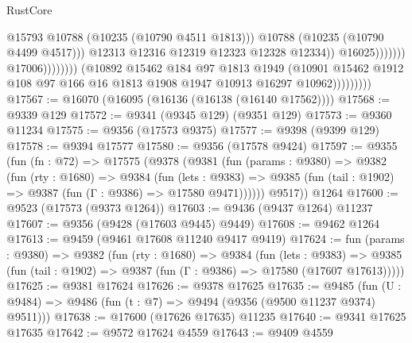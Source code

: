 \begin{lexlean}{RustCore}
\begin{coremodule}
                                                        @15793
                                                        @10788
                                                        (@10235 (@10790 @4511 @1813)))
                                                      @10788
                                                      (@10235 (@10790 @4499 @4517)))
                                                    @12313
                                                    @12316
                                                    @12319
                                                    @12323
                                                    @12328
                                                    @12334))
                                                @16025)))))))
                                  @17006))))))))
                  (@10892
                    @15462
                    @184
                    @97
                    @1813
                    @1949
                    (@10901
                      @15462
                      @1912
                      @108
                      @97
                      @166
                      @16
                      @1813
                      @1908
                      @1947
                      @10913
                      @16297
                      @10962)))))))))
@17567 := @16070 (@16095 (@16136 (@16138 (@16140 @17562))))
@17568 := @9339 @129
@17572 := @9341 (@9345 @129) (@9351 @129)
@17573 := @9360 @11234
@17575 := @9356 (@17573 @9375)
@17577 := @9398 (@9399 @129)
@17578 := @9394 @17577
@17580 := @9356 (@17578 @9424)
@17597 := @9355
    (fun (fn : @72) =>
    @17575
      (@9378
        (@9381
          (fun (params : @9380) =>
          @9382
            (fun (rty : @1680) =>
            @9384
              (fun (lets : @9383) =>
              @9385 (fun (tail : @1902) => @9387 (fun (Γ : @9386) => @17580 @9471))))))
        @9517))
    @1264
@17600 := @9523 (@17573 (@9373 @1264))
@17603 := @9436 (@9437 @1264) @11237
@17607 := @9356 (@9428 (@17603 @9445) @9449)
@17608 := @9462 @1264
@17613 := @9459 (@9461 @17608 @11240 @9417 @9419)
@17624 := fun (params : @9380) =>
  @9382
    (fun (rty : @1680) =>
    @9384
      (fun (lets : @9383) =>
      @9385 (fun (tail : @1902) => @9387 (fun (Γ : @9386) => @17580 (@17607 @17613)))))
@17625 := @9381 @17624
@17626 := @9378 @17625
@17635 := @9485
    (fun (U : @9484) => @9486 (fun (t : @7) => @9494 (@9356 (@9500 @11237 @9374) @9511)))
@17638 := @17600 (@17626 @17635) @11235
@17640 := @9341 @17625 @17635
@17642 := @9572 @17624 @4559
@17643 := @9409 @4559

\end{coremodule}
\end{lexlean}
